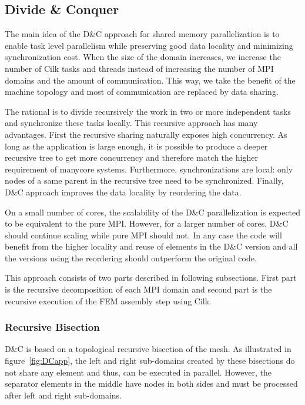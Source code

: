 \documentclass{IOS-Book-Article}
\begin{document}
\subsection{Divide \& Conquer}

The main idea of the D\&C approach for shared memory parallelization is to enable task level parallelism while preserving good data locality and minimizing synchronization cost.
When the size of the domain increases, we increase the number of Cilk tasks and threads instead of increasing the number of MPI domains and the amount of communication.
This way, we take the benefit of the machine topology and most of communication are replaced by data sharing.

The rational is to divide recursively the work in two or more independent tasks and synchronize these tasks locally. This recursive approach has many advantages.
First the recursive sharing naturally exposes high concurrency. As long as the application is large enough, it is possible to produce a deeper recursive tree to get more concurrency and 
therefore match the higher requirement of manycore systems. Furthermore, synchronizations are local: only nodes of a same parent in the recursive tree need to be synchronized.
Finally, D\&C approach improves the data locality by reordering the data. 

On a small number of cores, the scalability of the D\&C parallelization is expected to be equivalent to the pure MPI.
However, for a larger number of cores, D\&C should continue scaling while pure MPI should not.
In any case the code will benefit from the higher locality and reuse of elements in the D\&C version and all the versions using the reordering should outperform the original code.

This approach consists of two parts described in following subsections.
First part is the recursive decomposition of each MPI domain and second part is the recursive execution of the FEM assembly step using Cilk.

\subsubsection{Recursive Bisection}
\label{sec:DCrec}
D\&C is based on a topological recursive bisection of the mesh.
As illustrated in figure~\ref{fig:DCapp}, the left and right sub-domains created by these bisections do not share any element and thus, can be executed in parallel.
However, the separator elements in the middle have nodes in both sides and must be processed after left and right sub-domains.
\end{document}
